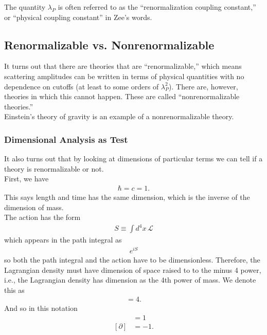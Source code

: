 \documentclass{book}
\theoremstyle{definition}
\newcommand{\p}{\partial}
\newcommand{\lag}{\mathcal{L}}
\begin{document}
The quantity $\lambda_P$ is often referred to as the ``renormalization coupling constant,'' or ``physical coupling constant'' in Zee's words.  















\newpage

\subsection{Renormalizable vs. Nonrenormalizable}



It turns out that there are theories that are ``renormalizable,'' which means scattering amplitudes can be written in terms of physical quantities with no dependence on cutoffs (at least to some orders of $\lambda_P^2$). There are, however, theories in which this cannot happen. These are called ``nonrenormalizable theories.''\\

Einstein's theory of gravity is an example of a nonrenormalizable theory. 


\subsubsection{Dimensional Analysis as Test}


It also turns out that by looking at dimensions of particular terms we can tell if a theory is renormalizable or not. \\

First, we have 
\begin{align}
\hbar = c = 1.
\end{align}
This says length and time has the same dimension, which is the inverse of the dimension of mass. \\

The action has the form
\begin{align}
S \equiv \int d^4x\,\lag
\end{align}
which appears in the path integral as
\begin{align}
e^{iS}
\end{align}
so both the path integral and the action have to be dimensionless. Therefore, the Lagrangian density must have dimension of space raised to to the minus 4 power, i.e., the Lagrangian density has dimension as the 4th power of mass. We denote this as
\begin{align}
[\lag] = 4.
\end{align}
And so in this notation 
\begin{align}
[x] &= 1 \\ 
[\p] &= -1.
\end{align}
\end{document}

